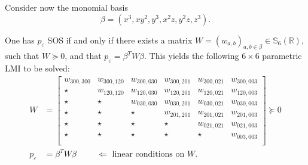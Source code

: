 \documentclass[nonacm]{acmart}
\begin{document}
Consider now the monomial basis
\begin{equation*}
    \beta = (x^3, xy^2, y^3, x^2z, y^2z, z^3).
\end{equation*}

One has $p_\varepsilon$ SOS if and only if there exists a matrix
$W = (w_{a,b})_{a,b\in \beta} \in \mathbb{S}_6(\mathbb{R})$,
such that $W \succeq 0$, and that $p_\varepsilon = \beta^T W \beta$.
This yields the following $6 \times 6$ parametric LMI to be solved:
\begin{equation*}
    \begin{aligned}
        W             & =
        \begin{bmatrix}
            w_{300,300} & w_{300,120} & w_{300,030} & w_{300,201} & w_{300,021} & w_{300,003} \\
            \star       & w_{120,120} & w_{120,030} & w_{120,201} & w_{120,021} & w_{120,003} \\
            \star       & \star       & w_{030,030} & w_{030,201} & w_{030,021} & w_{030,003} \\
            \star       & \star       & \star       & w_{201,201} & w_{201,021} & w_{201,003} \\
            \star       & \star       & \star       & \star       & w_{021,021} & w_{021,003} \\
            \star       & \star       & \star       & \star       & \star       & w_{003,003} \\
        \end{bmatrix}
        \succeq 0                                                                                  \\
        p_\varepsilon & = \beta^T W \beta \hspace{1cm} \Leftarrow \text{ linear conditions on } W.
    \end{aligned}
\end{equation*}
\end{document}
